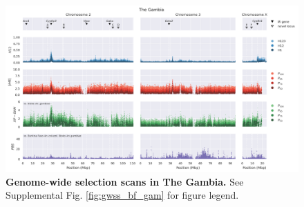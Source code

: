 \documentclass[a4paper,11pt,abstracton,hidelinks]{scrartcl}
\begin{document}
\begin{landscape}
\begin{figure}[t!]
	\begin{center}
		\includegraphics*[width=1.05\linewidth,center]{artwork/gwss_gm_gq_gam_bf_col_gq_gam.png}
	\end{center}
	\caption[Genome-wide selection scans in The Gambia]{
	\textbf{Genome-wide selection scans in The Gambia.} 
	See Supplemental Fig. \ref{fig:gwss_bf_gam} for figure legend.
	} 
	\label{fig:gwss_gm}
\end{figure}


\end{landscape}

\clearpage
\end{document}
